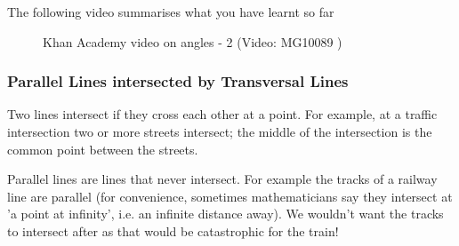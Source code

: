 The following video summarises what you have learnt so far
\setcounter{subfigure}{0}
\begin{figure}[H] %
\textnormal{Khan Academy video on angles - 2}\vspace{.1in} \nopagebreak
\label{m39370*yt-media2}\label{m39370*yt-video2}
 { (Video:  MG10089 )}
\vspace{2pt}
\vspace{.1in}
\end{figure}       \par 

\subsubsection{ Parallel Lines intersected by Transversal Lines}
Two lines intersect if they cross each other at a point. For example, at a traffic intersection two or more streets intersect; the middle of the intersection is the common point between the streets.\par 
Parallel lines are lines that never intersect. For example the tracks of a railway line are parallel (for convenience, sometimes mathematicians say they intersect at 'a point at infinity', i.e. an infinite distance away). We wouldn't want the tracks to intersect after as that would be catastrophic for the train!\par 

